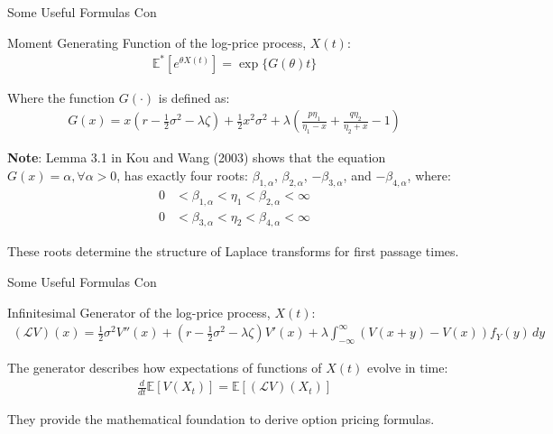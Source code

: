 \documentclass{beamer}
\begin{document}
\begin{frame}{Some Useful Formulas Con}

    {\footnotesize \footnotesize
    \par Moment Generating Function of the log-price process, \( X(t) \):
    \begin{align*}
        \mathbb{E}^* \left[ e^{\theta X(t)} \right] = \exp\{G(\theta)t\}
    \end{align*}
    \par Where the function $G(\cdot)$ is defined as:
    \begin{align*}
        G(x) = x \left( r - \frac{1}{2} \sigma^2 - \lambda \zeta \right) + \frac{1}{2} x^2 \sigma^2 
        + \lambda \left( \frac{p \eta_1}{\eta_1 - x} + \frac{q \eta_2}{\eta_2 + x} - 1 \right)
    \end{align*}
    \par \textbf{Note}: Lemma 3.1 in Kou and Wang (2003) shows that the 
    equation \( G(x) = \alpha, \forall \alpha > 0 \), has exactly 
    four roots: \(\beta_{1,\alpha}\), \(\beta_{2,\alpha}\), \(-\beta_{3,\alpha}\), and \(-\beta_{4,\alpha}\), where: 
    \begin{align*}
        0 &< \beta_{1,\alpha} < \eta_1 < \beta_{2,\alpha} < \infty\\
        0 &< \beta_{3,\alpha} < \eta_2 < \beta_{4,\alpha} < \infty
    \end{align*}
    \par These roots determine the structure of Laplace transforms for first passage times.
    }
    
\end{frame}
\begin{frame}{Some Useful Formulas Con}

    {\footnotesize \footnotesize
    \par Infinitesimal Generator of the log-price process, \( X(t) \):
    \vspace{1em}
    \begin{align*}
        (\mathcal{L}V)(x) = \frac{1}{2}\sigma^2 V''(x) + \left(r - \frac{1}{2}\sigma^2 
        - \lambda\zeta\right)V'(x) + \lambda \int_{-\infty}^{\infty}\left(V(x+y) - V(x)\right)f_Y(y)\,dy
    \end{align*}
    \vspace{1em}
    \par The generator describes how expectations of functions of \( X(t) \) evolve in time:
    \vspace{1em}
    \begin{align*}
        \frac{d}{dt}\mathbb{E}[V(X_t)] = \mathbb{E}[(\mathcal{L}V)(X_t)]
    \end{align*}
    \vspace{1em}
    \par They provide the mathematical foundation to derive option pricing formulas.



    }
    
\end{frame}
\end{document}
